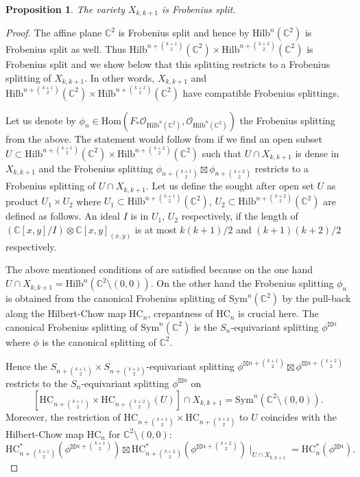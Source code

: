 \documentclass[12pt]{amsart}
\newcommand{\Hilb}{\mathrm{Hilb}}
\newcommand{\C}{\mathbb{C}}
\newcommand{\Sym}{\mathrm{Sym}}
\newcommand{\Hom}{\mathrm{Hom}}
\newcommand{\HC}{\mathrm{HC}}
\numberwithin{equation}{section}
\newtheorem{proposition}[theorem]{Proposition}
\theoremstyle{definition}
\begin{document}
\begin{proposition}
  The variety \(X_{k,k+1}\) is Frobenius split.
\end{proposition}
\begin{proof}
  The affine plane \(\C^2\) is Frobenius split and hence by \cite[Theorem 7.5.2]{FrobBook}
  \(\Hilb^n(\C^2)\) is Frobenius split as well. 
  Thus \(\Hilb^{n+\binom{k+1}{2}}(\C^2)\times \Hilb^{n+\binom{k+2}{2}}(\C^2)\) is Frobenius split and we
  show below that this splitting restricts to a Frobenius splitting of \(X_{k,k+1}\). In other words, \(X_{k,k+1}\) and \(\Hilb^{n+\binom{k+1}{2}}(\C^2)\times \Hilb^{n+\binom{k+2}{2}}(\C^2)\) have compatible Frobenius splittings.

  Let us denote by \(\phi_n\in \Hom\left(F_*\mathcal{O}_{\Hilb^n(\C^2)},\mathcal{O}_{\Hilb^n(\C^2)}\right)\) the Frobenius splitting from the above.
  The statement would follow from \cite[Lemma 1.1.7(ii)]{FrobBook} if we find an open subset \(U\subset \Hilb^{n+\binom{k+1}{2}}(\C^2)\times \Hilb^{n+\binom{k+2}{2}}(\C^2)\) such that \(U\cap X_{k,k+1}\) is dense in \(X_{k,k+1}\) and the Frobenius splitting
  \(\phi_{n+\binom{k+1}{2}}\boxtimes \phi_{n+\binom{k+2}{2}}\) restricts to a Frobenius splitting of \(U\cap X_{k,k+1}\).
  Let us define the sought after open set \(U\) as product \(U_1\times U_2\) where \(U_1\subset \Hilb^{n+\binom{k+1}{2}}(\C^2)\),
  \(U_2\subset \Hilb^{n+\binom{k+2}{2}}(\C^2)\) are defined as follows. An ideal \(I\) is in \(U_1\), \(U_2\) respectively, if
  the length of \((\C[x,y]/I)\otimes \C[x,y]_{(x,y)}\) is at most \(k(k+1)/2\) and \((k+1)(k+2)/2\) respectively.

  The above mentioned conditions of \cite[Lemma 1.1.7(ii)]{FrobBook} are satisfied because on the one hand \(U\cap X_{k,k+1}=\Hilb^n(\C^2\setminus (0,0))\).
  On the other hand the Frobenius splitting \(\phi_n\) is obtained from the canonical Frobenius splitting of \(\Sym^n(\C^2)\) by the pull-back along the Hilbert-Chow map \(\HC_n\), crepantness of \(\HC_n\) is crucial here. The canonical Frobenius splitting of
  \(\Sym^n(\C^2)\) is the \(S_n\)-equivariant splitting \(\phi^{\boxtimes n}\) where \(\phi\) is the canonical splitting of
  \(\C^2\).

  Hence the \(S_{n+\binom{k+1}{2}}\times S_{n+\binom{k+2}{2}}\)-equivariant splitting \(\phi^{\boxtimes n+\binom{k+1}{2}}\boxtimes \phi^{\boxtimes n+\binom{k+2}{2}}\) restricts to the \(S_n\)-equivariant splitting \(\phi^{\boxtimes n}\) on 
  \[\left[\HC_{n+\binom{k+1}{2}}\times \HC_{n+\binom{k+2}{2}}(U)\right]\cap X_{k,k+1}=\Sym^n(\C^2\setminus (0,0)).
  \] 
  Moreover, the restriction of \(\HC_{n+\binom{k+1}{2}}\times \HC_{n+\binom{k+2}{2}}\) to $U$ coincides with  the Hilbert-Chow map
  \(\HC_n\) for \(\C^2\setminus (0,0)\):
  \[\HC^*_{n+\binom{k+1}{2}}\left(\phi^{\boxtimes n+\binom{k+1}{2} }\right)\boxtimes \HC^*_{n+\binom{k+2}{2}}\left(\phi^{\boxtimes n+\binom{k+2}{2}}\right)\mid_{U\cap X_{k,k+1}}=
  \HC^*_{n}\left(\phi^{\boxtimes n }\right).\]
\end{proof}
\end{document}
